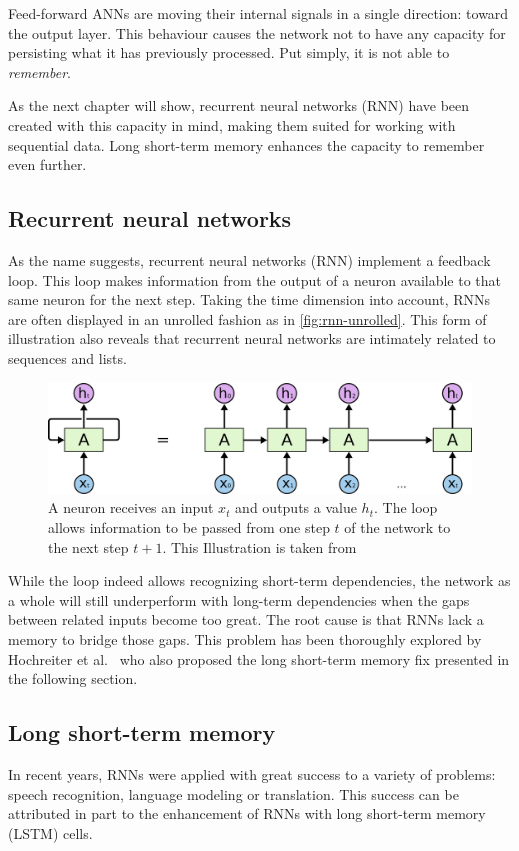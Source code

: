 Feed-forward ANNs are moving their internal signals in a single direction: toward the output layer. This behaviour causes the network not to have any capacity for persisting what it has previously processed. Put simply, it is not able to \textit{remember}.

As the next chapter will show, recurrent neural networks (RNN) have been created with this capacity in mind, making them suited for working with sequential data. Long short-term memory enhances the capacity to remember even further.

\subsection{Recurrent neural networks}\label{sec:recurrent-networks}
As the name suggests, recurrent neural networks (RNN) implement a feedback loop. This loop makes information from the output of a neuron available to that same neuron for the next step. Taking the time dimension into account, RNNs are often displayed in an unrolled fashion as in \autoref{fig:rnn-unrolled}. This form of illustration also reveals that recurrent neural networks are intimately related to sequences and lists.

\begin{figure}
    \centering
    \includegraphics[width=.9\textwidth]{gfx/rnn-unrolled.png}
    \caption{A neuron receives an input $x_t$ and outputs a value $h_t$. The loop allows information to be passed from one step $t$ of the network to the next step $t+1$. This Illustration is taken from \cite{web:colah}}
    \label{fig:rnn-unrolled}
\end{figure}

While the loop indeed allows recognizing short-term dependencies, the network as a whole will still underperform with long-term dependencies when the gaps between related inputs become too great. The root cause is that RNNs lack a memory to bridge those gaps. This problem has been thoroughly explored by Hochreiter et al.~\cite{hochreiter1991untersuchungen} who also proposed the long short-term memory fix presented in the following section.

\subsection{Long short-term memory}\label{sec:lstm}
In recent years, RNNs were applied with great success to a variety of problems: speech recognition, language modeling or translation. This success can be attributed in part to the enhancement of RNNs with long short-term memory (LSTM) cells.


